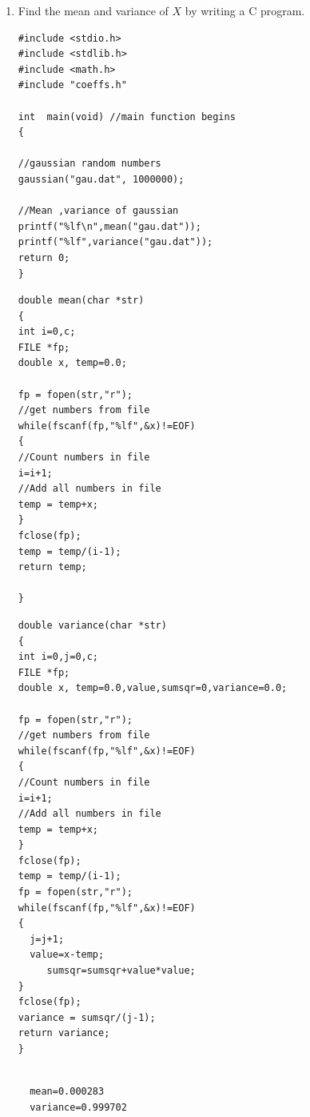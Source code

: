 \documentclass[10pt, a4paper]{article}
\begin{document}
\begin{enumerate}
 \item Find the mean and variance of $X$ by writing a C program.
\begin{lstlisting}
#include <stdio.h>
#include <stdlib.h>
#include <math.h>
#include "coeffs.h"

int  main(void) //main function begins
{
 
//gaussian random numbers
gaussian("gau.dat", 1000000);

//Mean ,variance of gaussian
printf("%lf\n",mean("gau.dat"));
printf("%lf",variance("gau.dat"));
return 0;
}
\end{lstlisting}
\begin{lstlisting}
double mean(char *str)
{
int i=0,c;
FILE *fp;
double x, temp=0.0;

fp = fopen(str,"r");
//get numbers from file
while(fscanf(fp,"%lf",&x)!=EOF)
{
//Count numbers in file
i=i+1;
//Add all numbers in file
temp = temp+x;
}
fclose(fp);
temp = temp/(i-1);
return temp;

}
\end{lstlisting}
\begin{lstlisting}
double variance(char *str)
{
int i=0,j=0,c;
FILE *fp;
double x, temp=0.0,value,sumsqr=0,variance=0.0;

fp = fopen(str,"r");
//get numbers from file
while(fscanf(fp,"%lf",&x)!=EOF)
{
//Count numbers in file
i=i+1;
//Add all numbers in file
temp = temp+x;
}
fclose(fp);
temp = temp/(i-1);
fp = fopen(str,"r");
while(fscanf(fp,"%lf",&x)!=EOF)
{
  j=j+1;
  value=x-temp;
     sumsqr=sumsqr+value*value;
}
fclose(fp);
variance = sumsqr/(j-1);
return variance;
}


\end{lstlisting}

\begin{lstlisting}
  mean=0.000283
  variance=0.999702
\end{lstlisting}

\begin{center}
\end{center}


\end{enumerate}
\end{document}
